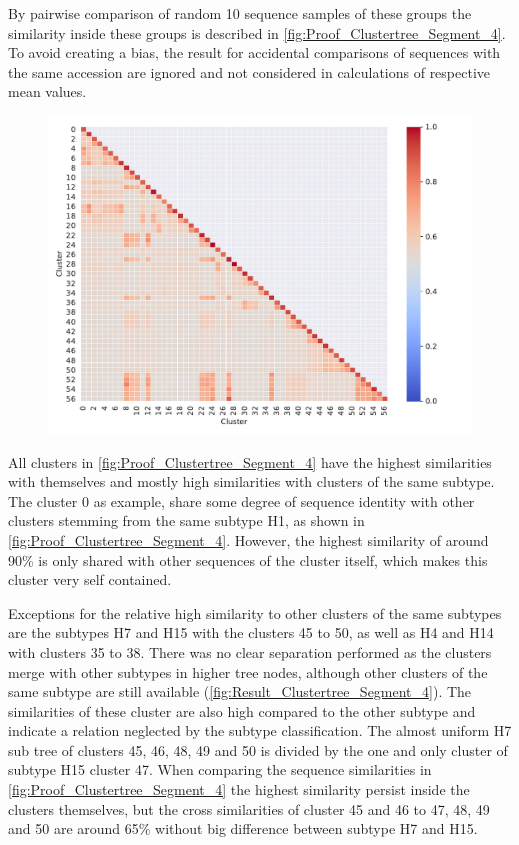 By pairwise comparison of random 10 sequence samples of these groups the similarity inside these groups is described in \autoref{fig:Proof_Clustertree_Segment_4}. To avoid creating a bias, the result for accidental comparisons of sequences with the same accession are ignored and not considered in calculations of respective mean values.

\begin{figure}[!hbt]
    \centering
    \includegraphics[width=\textwidth]{Results/Cluster_Difference_Segment_4.pdf}
    \caption[]{}
    \label{fig:Proof_Clustertree_Segment_4}
\end{figure}

All clusters in \autoref{fig:Proof_Clustertree_Segment_4} have the highest similarities with themselves and mostly high similarities with clusters of the same subtype. The cluster 0 as example, share some degree of sequence identity with other clusters stemming from the same subtype H1, as shown in \autoref{fig:Proof_Clustertree_Segment_4}. However, the highest similarity of around 90\% is only shared with other sequences of the cluster itself, which makes this cluster very self contained. 

Exceptions for the relative high similarity to other clusters of the same subtypes are the subtypes H7 and H15 with the clusters 45 to 50, as well as H4 and H14 with clusters 35 to 38. There was no clear separation performed as the clusters merge with other subtypes in higher tree nodes, although other clusters of the same subtype are still available (\autoref{fig:Result_Clustertree_Segment_4}). The similarities of these cluster are also high compared to the other subtype and indicate a relation neglected by the subtype classification. The almost uniform H7 sub tree of clusters 45, 46, 48, 49 and 50 is divided by the one and only cluster of subtype H15 cluster 47. When comparing the sequence similarities in \autoref{fig:Proof_Clustertree_Segment_4} the highest similarity persist inside the clusters themselves, but the cross similarities of cluster 45 and 46 to 47, 48, 49 and 50 are around 65\% without big difference between subtype H7 and H15.  

